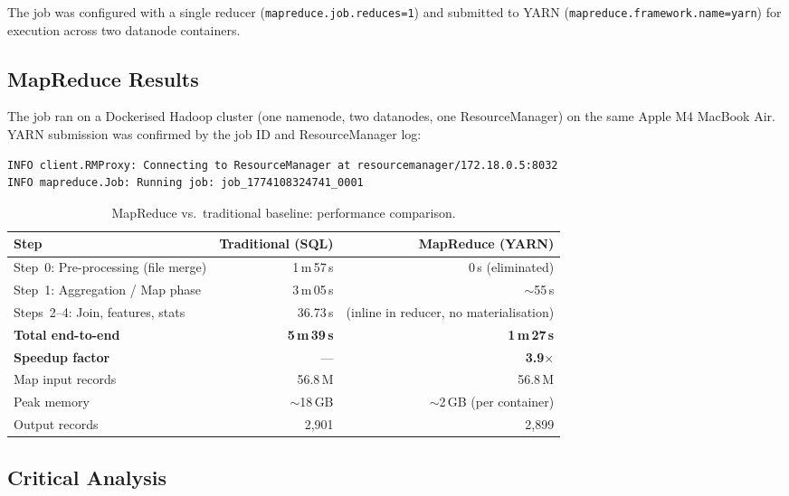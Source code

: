 \documentclass[11pt]{article}
\begin{document}
The job was configured with a single reducer (\texttt{mapreduce.job.reduces=1}) and submitted to YARN (\texttt{mapreduce.framework.name=yarn}) for execution across two datanode containers.

\subsection{MapReduce Results}

The job ran on a Dockerised Hadoop cluster (one namenode, two datanodes, one ResourceManager) on the same Apple M4 MacBook Air. YARN submission was confirmed by the job ID and ResourceManager log:

\begin{lstlisting}[language=bash]
INFO client.RMProxy: Connecting to ResourceManager at resourcemanager/172.18.0.5:8032
INFO mapreduce.Job: Running job: job_1774108324741_0001
\end{lstlisting}

\begin{table}[H]
\centering
\caption{MapReduce vs.\ traditional baseline: performance comparison.}
\label{tab:comparison}
\renewcommand{\arraystretch}{1.15}
\small
\begin{tabularx}{\textwidth}{l r r}
\toprule
\textbf{Step} & \textbf{Traditional (SQL)} & \textbf{MapReduce (YARN)} \\
\midrule
Step~0: Pre-processing (file merge) & 1\,m\,57\,s   & 0\,s (eliminated) \\
Step~1: Aggregation / Map phase     & 3\,m\,05\,s   & $\sim$55\,s \\
Steps~2--4: Join, features, stats   & 36.73\,s      & (inline in reducer, no materialisation) \\
\midrule
\textbf{Total end-to-end}           & \textbf{5\,m\,39\,s} & \textbf{1\,m\,27\,s} \\
\textbf{Speedup factor}             & ---           & \textbf{3.9$\times$} \\
\midrule
Map input records  & 56.8\,M & 56.8\,M \\
Peak memory        & $\sim$18\,GB & $\sim$2\,GB (per container) \\
Output records     & 2,901   & 2,899   \\
\bottomrule
\end{tabularx}
\end{table}

\subsection{Critical Analysis}
\end{document}
